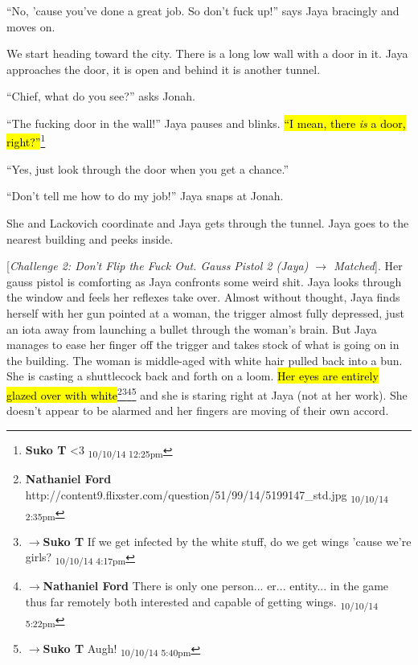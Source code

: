 ``No, 'cause you've done a great job.  So don't fuck up!'' says Jaya bracingly and moves on.





We start heading toward the city.  There is a long low wall with a door in it.  Jaya approaches the door, it is open and behind it is another tunnel.

``Chief, what do you see?'' asks Jonah.

``The fucking door in the wall!'' Jaya pauses and blinks.  \hl{``I mean, there \textit{is} a door, right?''}\footnote{\textbf{Suko T }\textless 3 \textsubscript{10/10/14 12:25pm}}

``Yes, just look through the door when you get a chance.''

``Don't tell me how to do my job!'' Jaya snaps at Jonah.  

She and Lackovich coordinate and Jaya gets through the tunnel.  Jaya goes to the nearest building and peeks inside.

{[}\textit{Challenge 2: Don't Flip the Fuck Out.  Gauss Pistol 2 (Jaya) $\rightarrow$ Matched}{]}.   Her gauss pistol is comforting as Jaya confronts some weird shit.  Jaya looks through the window and feels her reflexes take over.  Almost without thought, Jaya finds herself with her gun pointed at a woman, the trigger almost fully depressed, just an iota away from launching a bullet through the woman's brain.  But Jaya manages to ease her finger off the trigger and takes stock of what is going on in the building.  The woman is middle-aged with white hair pulled back into a bun.  She is casting a shuttlecock back and forth on a loom.  \hl{Her eyes are entirely glazed over with white}\footnote{\textbf{Nathaniel Ford }http://content9.flixster.com/question/51/99/14/5199147\_std.jpg \textsubscript{10/10/14 2:35pm}}\footnote{$\rightarrow$\textbf{Suko T }If we get infected by the white stuff, do we get wings 'cause we're girls? \textsubscript{10/10/14 4:17pm}}\footnote{$\rightarrow$\textbf{Nathaniel Ford }There is only one person... er... entity... in the game thus far remotely both interested and capable of getting wings. \textsubscript{10/10/14 5:22pm}}\footnote{$\rightarrow$\textbf{Suko T }Augh!  \textsubscript{10/10/14 5:40pm}} and she is staring right at Jaya (not at her work).  She doesn't appear to be alarmed and her fingers are moving of their own accord.


